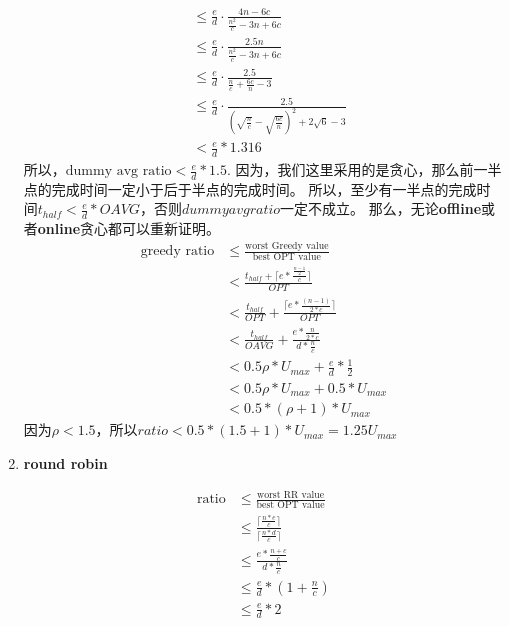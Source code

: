 \documentclass[UTF8]{ctexart}
\newcommand{\Emph}{\textbf}
\begin{document}
\begin{enumerate}[(1)]
\begin{align*}
								&\le \frac{e}{d} \cdot \frac{4n-6c}{\frac{n^2}{c}-3n+6c} \\
								&\le \frac{e}{d} \cdot \frac{2.5n}{\frac{n^2}{c}-3n+6c} \\
								&\le \frac{e}{d} \cdot \frac{2.5}{\frac{n}{c}+\frac{6c}{n}-3} \\
								&\le \frac{e}{d} \cdot \frac{2.5}{(\sqrt{\frac{n}{c}} - \sqrt{\frac{6c}{n}})^2+2\sqrt{6}-3} \\
								&< \frac{e}{d} * 1.316
	\end{align*}
	所以，$\text{dummy avg ratio} < \frac{e}{d} * 1.5$.
	因为，我们这里采用的是贪心，那么前一半点的完成时间一定小于后于半点的完成时间。
	所以，至少有一半点的完成时间$t_{half} < \frac{e}{d}*OAVG$，否则$dummy avg ratio$一定不成立。
	那么，无论\Emph{offline}或者\Emph{online}贪心都可以重新证明。
	\begin{align*}
		\text{greedy ratio} &\le \frac{\text{worst Greedy value}}{\text{best OPT value}} \\
								&< \frac{t_{half} + \lceil e*\frac{\frac{n-1}{2}}{c} \rceil}{OPT} \\
								&< \frac{t_{half}}{OPT} + \frac{ \lceil e*\frac{(n-1)}{2*c} \rceil }{OPT} \\
								&< \frac{t_{half}}{OAVG} + \frac{e*\frac{n}{2*c}}{d*\frac{n}{c}} \\
								&< 0.5\rho*U_{max} + \frac{e}{d} * \frac{1}{2} \\
								&< 0.5\rho*U_{max} + 0.5*U_{max} \\
                                &< 0.5*(\rho+1)*U_{max}
 	\end{align*}
	因为$\rho<1.5$，所以$ratio < 0.5*(1.5+1)*U_{max} = 1.25U_{max}$
	
    \newpage
    \item \Emph{round robin}

    \begin{align*}
        \text{ratio} &\le \frac{\text{worst RR value}}{\text{best OPT value}} \\
					 &\le \frac{\lceil \frac{n*e}{c} \rceil}{\lceil \frac{n*d}{c} \rceil} \\
					 &\le \frac{e * \frac{n+c}{c}}{d * \frac{n}{c}} \\
					 &\le \frac{e}{d} * (1 + \frac{n}{c}) \\
					 &\le \frac{e}{d} * 2
    \end{align*}


\end{enumerate}
\end{document}
